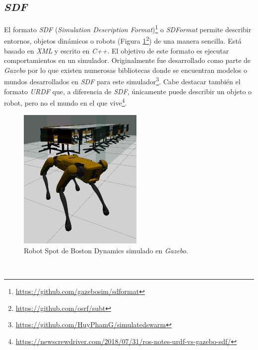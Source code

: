 \subsection{\textit{SDF}}
\label{subsection:sdf}
El formato \textit{SDF} (\textit{Simulation Description Format})\footnote{\url{https://github.com/gazebosim/sdformat}} o \textit{SDFormat} permite describir entornos, objetos dinámicos o robots (Figura \ref{fig:spot}\footnote{\url{https://github.com/osrf/subt}}) de una manera sencilla. Está basado en \textit{XML} y escrito en \textit{C++}. El objetivo de este formato es ejecutar comportamientos en un simulador. Originalmente fue desarrollado como parte de \textit{Gazebo} por lo que existen numerosas bibliotecas donde se encuentran modelos o mundos desarrollados en \textit{SDF} para este simulador\footnote{\url{https://github.com/HuyPhamG/simulatedswarm}}. Cabe destacar también el formato \textit{URDF} que, a diferencia de \textit{SDF}, únicamente puede describir un objeto o robot, pero no el mundo en el que vive\footnote{\url{https://newscrewdriver.com/2018/07/31/ros-notes-urdf-vs-gazebo-sdf/}}.\\

\begin{figure} [h!]
	\begin{center}
		\includegraphics[width=6cm]{figs/spot}
	\end{center}
	\caption{Robot Spot de Boston Dynamics simulado en \textit{Gazebo}.}
	\label{fig:spot}
\end{figure}\

